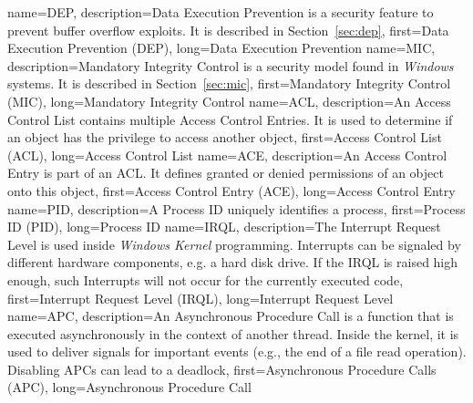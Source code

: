 {
  name={DEP},
  description={Data Execution Prevention is a security feature to prevent buffer overflow exploits. It is described in Section~\ref{sec:dep}},
  first={Data Execution Prevention (DEP)},
  long={Data Execution Prevention}
}
{
  name={MIC},
  description={Mandatory Integrity Control is a security model found in \emph{Windows} systems. It is described in Section~\ref{sec:mic}},
  first={Mandatory Integrity Control (MIC)},
  long={Mandatory Integrity Control}
}
{
  name={ACL},
  description={An Access Control List contains multiple Access Control Entries. It is used to determine if an object has the privilege to access another object},
  first={Access Control List (ACL)},
  long={Access Control List}
}
{
  name={ACE},
  description={An Access Control Entry is part of an ACL. It defines granted or denied permissions of an object onto this object},
  first={Access Control Entry (ACE)},
  long={Access Control Entry}
}
{
  name={PID},
  description={A Process ID uniquely identifies a process},
  first={Process ID (PID)},
  long={Process ID}
}
{
  name={IRQL},
  description={The Interrupt Request Level is used inside \emph{Windows Kernel} programming. Interrupts can be signaled by different hardware components, e.g. a hard disk drive. If the IRQL is raised high enough, such Interrupts will not occur for the currently executed code},
  first={Interrupt Request Level (IRQL)},
  long={Interrupt Request Level}
}
{
  name={APC},
  description={An Asynchronous Procedure Call is a function that is executed asynchronously in the context of another thread. Inside the kernel, it is used to deliver signals for important events (e.g., the end of a file read operation). Disabling APCs can lead to a deadlock},
  first={Asynchronous Procedure Calls (APC)},
  long={Asynchronous Procedure Call}
}